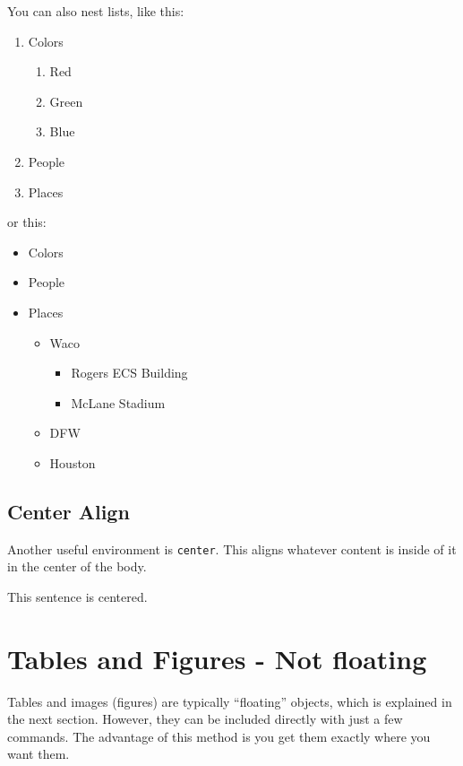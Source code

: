 \documentclass[11pt]{article}
\begin{document}
You can also nest lists, like this:

\begin{enumerate}
	\item Colors
	\begin{enumerate}
		\item Red
		\item Green
		\item Blue
	\end{enumerate}
	\item People
	\item Places
\end{enumerate}

or this:

\begin{itemize}
	\item Colors
	\item People
	\item Places
		\begin{itemize}
		\item Waco
			\begin{itemize}
			\item Rogers ECS Building
			\item McLane Stadium
			\end{itemize}
		\item DFW
		\item Houston
		\end{itemize}
\end{itemize}



\subsection*{Center Align}

Another useful environment is \texttt{center}.  This aligns whatever content is inside of it in the center of the body.

\begin{center}
	This sentence is centered.
\end{center}


\section*{Tables and Figures - Not floating}

Tables and images (figures) are typically ``floating'' objects, which is explained in the next section.  However, they can be included directly with just a few commands.  The advantage of this method is you get them exactly where you want them.
\end{document}
